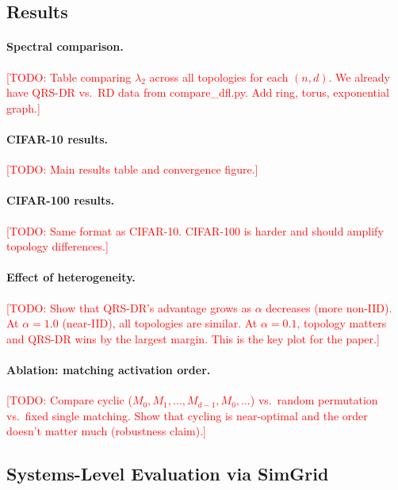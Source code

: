 \documentclass{article}
\newcommand{\lam}{\lambda_2}
\begin{document}
\subsection{Results}
\label{sec:results}

\paragraph{Spectral comparison.}
\textcolor{red}{[TODO: Table comparing $\lam$ across all topologies for each
$(n, d)$.  We already have QRS-DR vs.\ RD data from compare\_dfl.py.
Add ring, torus, exponential graph.]}

\paragraph{CIFAR-10 results.}
\textcolor{red}{[TODO: Main results table and convergence figure.]}

\paragraph{CIFAR-100 results.}
\textcolor{red}{[TODO: Same format as CIFAR-10.  CIFAR-100 is harder and
should amplify topology differences.]}

\paragraph{Effect of heterogeneity.}
\textcolor{red}{[TODO: Show that QRS-DR's advantage grows as $\alpha$ decreases
(more non-IID).  At $\alpha = 1.0$ (near-IID), all topologies are similar.
At $\alpha = 0.1$, topology matters and QRS-DR wins by the largest margin.
This is the key plot for the paper.]}

\paragraph{Ablation: matching activation order.}
\textcolor{red}{[TODO: Compare cyclic ($M_0, M_1, \ldots, M_{d-1}, M_0, \ldots$)
vs.\ random permutation vs.\ fixed single matching.  Show that cycling is
near-optimal and the order doesn't matter much (robustness claim).]}


\subsection{Systems-Level Evaluation via SimGrid}
\label{sec:simgrid}
\end{document}
